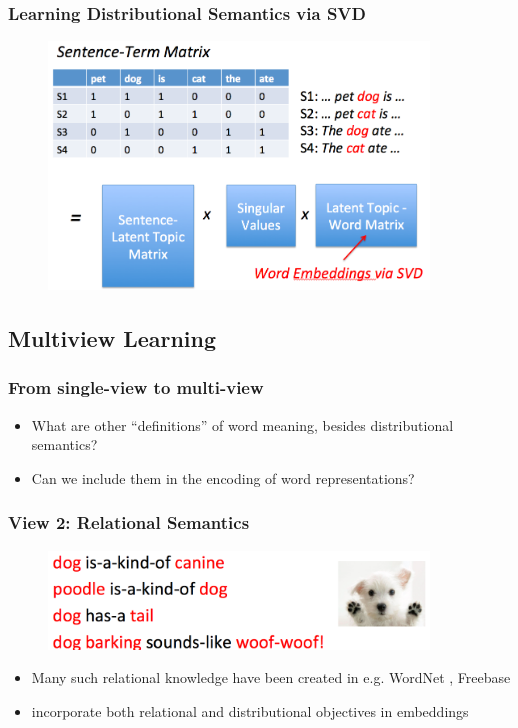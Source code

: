 \documentclass{beamer}
\newcommand{\bi}{\begin{itemize}}
\newcommand{\ei}{\end{itemize}}
\begin{document}
\begin{frame}
\frametitle{Learning Distributional Semantics via SVD}
\begin{figure}[htbp]
\begin{center}
\includegraphics[width=0.9\textwidth]{figs/word_embedding_lsa}
\end{center}
\end{figure}
\end{frame}

\subsection[Multiview Learning]{Multiview Learning}

\begin{frame}
\frametitle{From single-view to multi-view}
\bi
\item What are other ``definitions'' of word meaning, besides distributional semantics?
\item Can we include them in the encoding of word representations?
\ei
\end{frame}

\begin{frame}
\frametitle{View 2: Relational Semantics}
\begin{figure}[htbp]
\begin{center}
\includegraphics[width=0.9\textwidth]{figs/relational_semantics1}
\end{center}
\end{figure}
\vspace{1cm}
\bi
\item Many such relational knowledge have been created in e.g. WordNet \cite{miller95wordnet}, Freebase \cite{bollacker08freebase}
\item \cite{faruqui14retrofit,fried15iclr} incorporate both relational and distributional objectives in embeddings
\ei
\end{frame}
\end{document}
